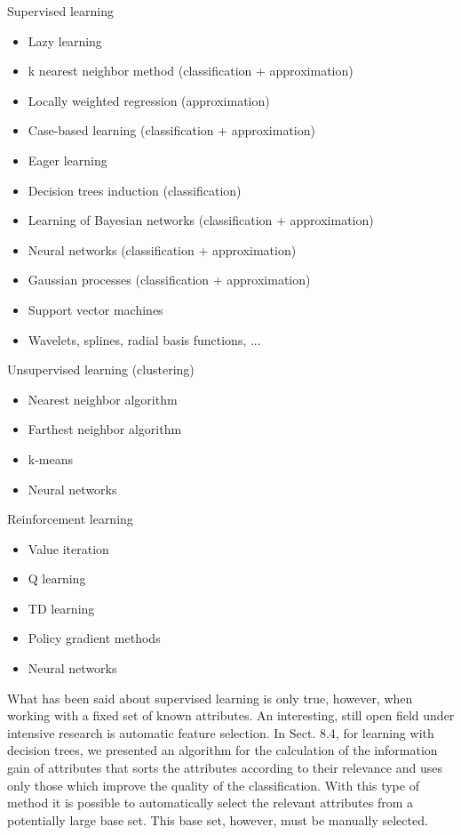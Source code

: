 \documentclass[10pt]{book}
\begin{document}
Supervised learning

\begin{itemize}
  \item Lazy learning
  \item k nearest neighbor method (classification + approximation)
  \item Locally weighted regression (approximation)
  \item Case-based learning (classification + approximation)
  \item Eager learning
  \item Decision trees induction (classification)
  \item Learning of Bayesian networks (classification + approximation)
  \item Neural networks (classification + approximation)
  \item Gaussian processes (classification + approximation)
  \item Support vector machines
  \item Wavelets, splines, radial basis functions, ...
\end{itemize}

Unsupervised learning (clustering)

\begin{itemize}
  \item Nearest neighbor algorithm
  \item Farthest neighbor algorithm
  \item k-means
  \item Neural networks
\end{itemize}

Reinforcement learning

\begin{itemize}
  \item Value iteration
  \item Q learning
  \item TD learning
  \item Policy gradient methods
  \item Neural networks
\end{itemize}

What has been said about supervised learning is only true, however, when working with a fixed set of known attributes. An interesting, still open field under intensive research is automatic feature selection. In Sect. 8.4, for learning with decision trees, we presented an algorithm for the calculation of the information gain of attributes that sorts the attributes according to their relevance and uses only those which improve the quality of the classification. With this type of method it is possible to automatically select the relevant attributes from a potentially large base set. This base set, however, must be manually selected.
\end{document}
